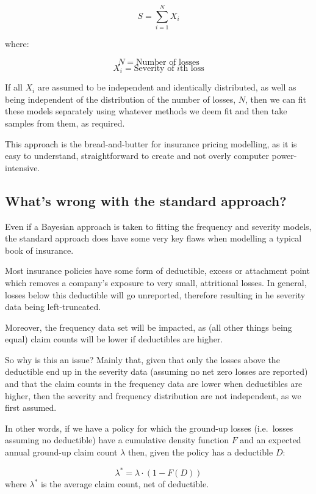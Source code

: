 \documentclass[
]{book}
\begin{document}
\[S = \sum_{i=1}^{N} X_i\]

where:

\[N = \mbox{Number of losses}\]
\[X_i = \mbox{Severity of } i \mbox{th loss}\]

If all \(X_i\) are assumed to be independent and identically distributed, as well as being independent of the distribution of the number of losses, \(N\), then we can fit these models separately using whatever methods we deem fit and then take samples from them, as required.

This approach is the bread-and-butter for insurance pricing modelling, as it is easy to understand, straightforward to create and not overly computer power-intensive.

\hypertarget{whats-wrong-with-the-standard-approach}{%
\subsection{What's wrong with the standard approach?}\label{whats-wrong-with-the-standard-approach}}

Even if a Bayesian approach is taken to fitting the frequency and severity models, the standard approach does have some very key flaws when modelling a typical book of insurance.

Most insurance policies have some form of deductible, excess or attachment point which removes a company's exposure to very small, attritional losses. In general, losses below this deductible will go unreported, therefore resulting in he severity data being left-truncated.

Moreover, the frequency data set will be impacted, as (all other things being equal) claim counts will be lower if deductibles are higher.

So why is this an issue? Mainly that, given that only the losses above the deductible end up in the severity data (assuming no net zero losses are reported) and that the claim counts in the frequency data are lower when deductibles are higher, then the severity and frequency distribution are not independent, as we first assumed.

In other words, if we have a policy for which the ground-up losses (i.e.~losses assuming no deductible) have a cumulative density function \(F\) and an expected annual ground-up claim count \(\lambda\) then, given the policy has a deductible \(D\):

\[\lambda^* = \lambda \cdot (1-F(D))\]
where \(\lambda^*\) is the average claim count, net of deductible.
\end{document}
